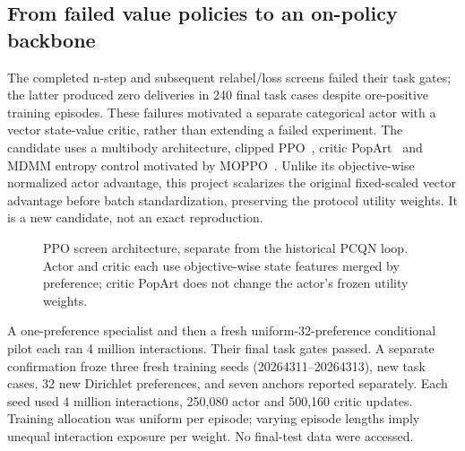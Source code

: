 \subsection{From failed value policies to an on-policy backbone}
The completed n-step and subsequent relabel/loss screens failed their task gates;
the latter produced zero deliveries in 240 final task cases despite ore-positive
training episodes. These failures motivated a separate categorical actor with
a vector state-value critic, rather than extending a failed experiment.
The candidate uses a multibody architecture, clipped PPO~\cite{schulman2017ppo},
critic PopArt~\cite{vanhasselt2016popart} and
MDMM entropy control motivated by MOPPO~\cite{terekhov2024architectures}.
Unlike its objective-wise normalized actor advantage, this project scalarizes
the original fixed-scaled vector advantage before batch standardization, preserving
the protocol utility weights. It is a new candidate, not an exact reproduction.

\begin{figure}[htbp]
\centering
\resizebox{\textwidth}{!}{}
\caption{PPO screen architecture, separate from the historical PCQN loop.
Actor and critic each use objective-wise state features merged by preference;
critic PopArt does not change the actor's frozen utility weights.}
\end{figure}

A one-preference specialist and then a fresh uniform-32-preference conditional
pilot each ran 4 million interactions. Their final task gates passed. A separate
confirmation froze three fresh training seeds (20264311--20264313), new task
cases, 32 new Dirichlet preferences, and seven anchors reported separately.
Each seed used 4 million interactions, 250,080 actor and 500,160 critic updates.
Training allocation was uniform per episode; varying episode lengths imply
unequal interaction exposure per weight. No final-test data were accessed.

